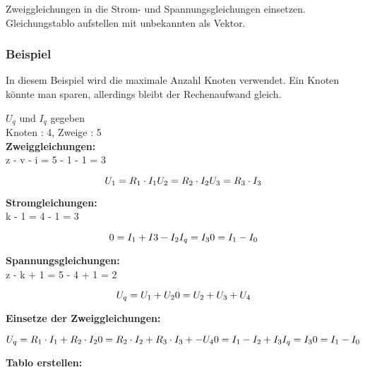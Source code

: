 Zweiggleichungen in die Strom- und Spannungsgleichungen einsetzen. 
Gleichungstablo aufstellen mit unbekannten als Vektor.

\subsubsection{Beispiel}

In diesem Beispiel wird die maximale Anzahl Knoten verwendet.
Ein Knoten könnte man sparen, allerdings bleibt der Rechenaufwand gleich.

\begin{center}
    
\end{center}
$U_q$ und $I_q$ gegeben\\
Knoten : 4, Zweige : 5\\

\textbf{Zweiggleichungen:}\\
z - v - i = 5 - 1 - 1 = 3

\[
U_1 = R_1 \cdot I_1\\
U_2 = R_2 \cdot I_2\\
U_3 = R_3 \cdot I_3
\]

\textbf{Stromgleichungen:}\\
k - 1 = 4 - 1 = 3 

\[
0 = I_1 + I3 - I_2\\
I_q = I_3\\
0 = I_1 - I_0
\]

\textbf{Spannungsgleichungen:}\\

z - k + 1 = 5 - 4 + 1 = 2

\[
U_q = U_1 + U_2\\
0 = U_2 + U_3 + U_4
\]

\textbf{Einsetze der Zweiggleichungen:}

\[
U_q = R_1 \cdot I_1 + R_2 \cdot I_2\\
0 = R_2 \cdot I_2 + R_3 \cdot I_3 + - U_4\\
0 = I_1 - I_2 + I_3\\
I_q = I_3\\
0 = I_1 - I_0
\]

\textbf{Tablo erstellen:}

